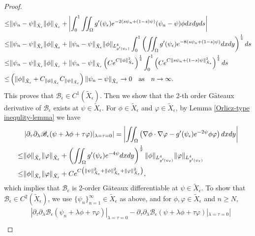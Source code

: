 \documentclass[1 [leqno, 11pt]{amsart}
\numberwithin{equation}{section}
\let\ep=\epsilon
\begin{document}
\begin{CJK*}{GBK}{song}
\begin{proof}
\begin{align*}
\leq&\|\psi_n-\psi\|_{\tilde X_\ep}\|\phi\|_{\tilde X_\ep}+\left|\int_0^1  \iint_{\Omega} g'(\psi_\ep) e^{-2(s\psi_n + (1-s)\psi)}  (\psi_n - \psi)  \phi dxdyds\right| \\
\leq&\|\psi_n-\psi\|_{\tilde X_\ep}\|\phi\|_{\tilde X_\ep}+\|\psi_n-\psi\|_{\tilde X_\ep}\|\phi\|_{L^4_{g'(\psi_\ep)}}\int_0^1 \left( \iint_{\Omega} g'(\psi_\ep) e^{-8(s\psi_n + (1-s)\psi)}  dxdy\right)^{1\over4}ds\\
\leq &  \|\psi_n-\psi\|_{\tilde X_\ep}\|\phi\|_{\tilde X_\ep}+
\|\psi_n-\psi\|_{\tilde X_\ep}
\left(Ce^{C\|\phi\|_{\tilde X_\ep}^2}\right)^{1\over4}
\int_0^1\left(Ce^{C\|s\psi_n + (1-s)\psi\|_{\tilde X_\ep}^2}\right)^{1\over4}ds\\
\leq &\left(\|\phi\|_{\tilde X_\ep}+C_{\|\phi\|_{\tilde X_\ep}}C_{\|\psi\|_{\tilde X_\ep}}\right)\|\psi_n-\psi\|_{\tilde X_\ep}\to 0\quad \text{as}\quad n\to\infty.
\end{align*}
This proves that $\mathscr{B}_\ep\in C^1(\tilde X_\ep)$.
Then we show that the 2-th order G$\hat{\text{a}}$teaux derivative of $\mathscr{B}_\ep$ exists at $\psi\in  \tilde{X}_\ep$. For
$\phi \in  \tilde{X}_\ep$ and $\varphi\in\tilde{X}_\ep$, by Lemma  \ref{Orlicz-type inequlity-lemma} we have
\begin{align*}
&\left|\partial_\tau\partial_\lambda \mathscr{B}_\ep(\psi + \lambda\phi+\tau\varphi)|_{\lambda =\tau= 0}\right|
= \left|\iint_{\Omega}\left(\nabla\phi\cdot\nabla\varphi- g'(\psi_\ep) e^{-2\psi}\phi\varphi\right)dxdy\right|\\
\leq&\|\phi\|_{\tilde{X}_\ep}\|\varphi\|_{\tilde{X}_\ep}+\left(\iint_{\Omega} g'(\psi_\ep) e^{-4\psi} dxdy\right)^{1\over2}
\|\phi\|_{L_{g'(\psi_\ep)}^4}\|\varphi\|_{L_{g'(\psi_\ep)}^4}\\
\leq&\|\phi\|_{\tilde{X}_\ep}\|\varphi\|_{\tilde{X}_\ep}+Ce^{C\left(\|\psi\|_{\tilde{X}_\ep}^2+\|\phi\|_{\tilde{X}_\ep}^2+\|\varphi\|_{\tilde{X}_\ep}^2\right)},
\end{align*}
which implies that   $\mathscr{B}_\ep$  is 2-order G$\hat{\text{a}}$teaux differentiable at $\psi\in  \tilde{X}_\ep$.
To show that $\mathscr{B}_\ep\in C^2(\tilde X_\ep)$, we use  $\{\psi_n\}_{n=1}^\infty\in \tilde X_\ep$  as above, and
  for  $\phi,\varphi\in\tilde X_\ep$ and $n\geq N$,
\begin{align*}
&|\partial_\tau\partial_\lambda \mathscr{B}_\ep(\psi_n + \lambda \phi+\tau\varphi)|_{\lambda =\tau= 0}-\partial_\tau\partial_\lambda \mathscr{B}_\ep(\psi + \lambda \phi+\tau\varphi)|_{\lambda =\tau= 0}|\\

\end{align*}
\end{proof}
\end{CJK*}
\end{document}
